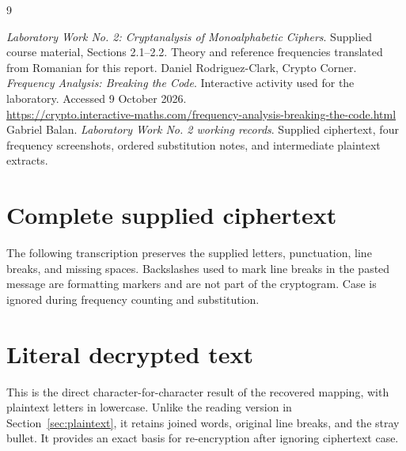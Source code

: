 \documentclass[12pt,a4paper]{article}
\begin{document}
\setlength{\parskip}{3pt}
{\small\setlength{\parskip}{0pt}\tableofcontents}
\clearpage

\clearpage

\clearpage

\clearpage

\clearpage

\clearpage

\clearpage
\begin{thebibliography}{9}
 \textit{Laboratory Work No. 2: Cryptanalysis of Monoalphabetic Ciphers}. Supplied course material, Sections 2.1--2.2. Theory and reference frequencies translated from Romanian for this report.
 Daniel Rodriguez-Clark, Crypto Corner. \textit{Frequency Analysis: Breaking the Code}. Interactive activity used for the laboratory. Accessed 9 October 2026.\\
\url{https://crypto.interactive-maths.com/frequency-analysis-breaking-the-code.html}
 Gabriel Balan. \textit{Laboratory Work No. 2 working records}. Supplied ciphertext, four frequency screenshots, ordered substitution notes, and intermediate plaintext extracts.
\end{thebibliography}

\clearpage
\appendix
\section{Complete supplied ciphertext}
\label{app:ciphertext}
The following transcription preserves the supplied letters, punctuation, line breaks, and missing spaces. Backslashes used to mark line breaks in the pasted message are formatting markers and are not part of the cryptogram. Case is ignored during frequency counting and substitution.
{}

\clearpage
\section{Literal decrypted text}
\label{app:literal}
This is the direct character-for-character result of the recovered mapping, with plaintext letters in lowercase. Unlike the reading version in Section~\ref{sec:plaintext}, it retains joined words, original line breaks, and the stray bullet. It provides an exact basis for re-encryption after ignoring ciphertext case.
{}
\end{document}
